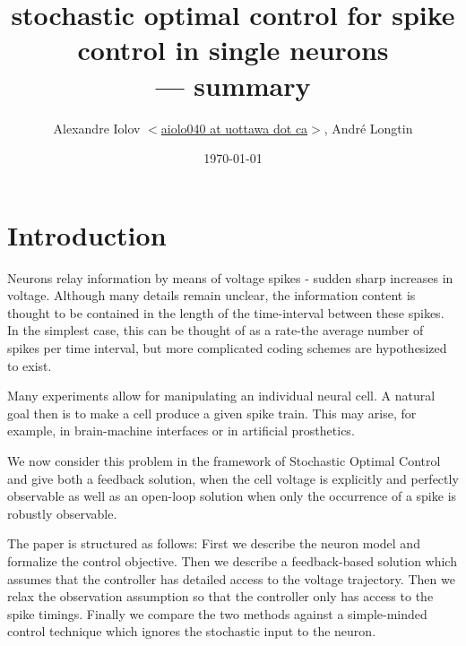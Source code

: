 \documentclass{article}
\begin{document}
\title{stochastic optimal control for spike control in single neurons
\\
---
\vskip5pt
summary
}
\author{Alexandre Iolov 
$<$\href{mailto:aiolo040@uottawa.ca}
		{aiolo040 at uottawa dot ca}$>$, 
		Andr\'e Longtin}

\date{\today}

\maketitle


\tableofcontents


\section{Introduction}
Neurons relay information by means of voltage spikes - sudden sharp increases in
voltage. Although many details remain unclear, the information content is
thought to be contained in the length of the time-interval between these spikes.
In the simplest case, this can be thought of as a rate-the average number of
spikes per time interval, but more complicated coding schemes are hypothesized to
exist. 

Many experiments allow for manipulating an individual neural cell. A natural
goal then is to make a cell produce a given spike train. This may arise, for
example, in brain-machine interfaces or in artificial prosthetics. 

We now consider this problem in the framework of Stochastic Optimal Control and
give both a feedback solution, when the cell voltage is explicitly and
perfectly observable as well as an open-loop solution when only the occurrence
of a spike is robustly observable. 

The paper is structured as follows: First we describe the neuron model and
formalize the control objective. Then we describe a feedback-based solution
which assumes that the controller has detailed access to the voltage trajectory.
Then we relax the observation assumption so that the controller only has access
to the spike timings. Finally we compare the two methods against a
simple-minded control technique which ignores the stochastic input to the
neuron.
\end{document}
